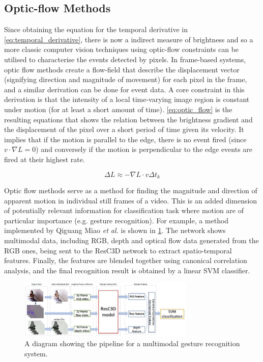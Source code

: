 \subsection{Optic-flow Methods}

Since obtaining the equation for the temporal derivative in \cref{eq:temporal_derivative}, there is now a indirect measure of brightness and so a more classic computer vision techniques using optic-flow constraints can be utilised to characterise the events detected by pixels. In frame-based systems, optic flow methods create a flow-field that describe the displacement vector (signifying direction and magnitude of movement) for each pixel in the frame, and a similar derivation can be done for event data. A core constraint in this derivation is that the intensity of a local time-varying image region is constant under motion (for at least a short amount of time)\cite{GenerativeEventModel}. \cref{eq:optic_flow} is the resulting equations that shows the relation between the brightness gradient and the displacement of the pixel over a short period of time given its velocity\cite{EventBasedVisionASurvery}. It implies that if the motion is parallel to the edge, there is no event fired (since $ v \cdot \nabla L = 0  $) and conversely if the motion is perpendicular to the edge events are fired at their highest rate.

\begin{equation}
      \Delta L \approx -\nabla L \cdot v \Delta t_k
      \label{eq:optic_flow}
\end{equation}

Optic flow methods serve as a method for finding the magnitude and direction of apparent motion in individual still frames of a video. This is an added dimension of potentially relevant information for classification task where motion are of particular importance (e.g. gesture recognition). For example, a method implemented by Qiguang Miao \textit{et al.}\cite{MultimodalGestureRecognition} is shown in \cref{fig:multimodal_gesture_recognition_pipeline}. The network shows multimodal data, including RGB, depth and optical flow data generated from the RGB ones, being sent to the ResC3D network to extract spatio-temporal features. Finally, the features are blended together using canonical correlation analysis, and the final recognition result is obtained by a linear SVM classifier.

\begin{figure}[htb]
      \centering
      \includegraphics[width=0.75\textwidth]{background/images/multimodal_gesture_recognition_pipeline.png}
      \caption{A diagram showing the pipeline for a multimodal gesture recognition system\cite{MultimodalGestureRecognition}.}
      \label{fig:multimodal_gesture_recognition_pipeline}
\end{figure}

